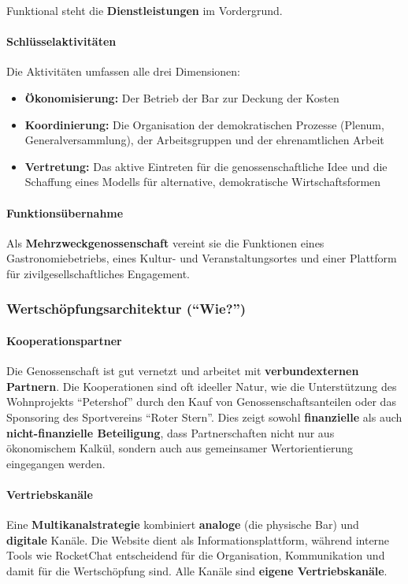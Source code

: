 Funktional steht die \textbf{Dienstleistungen} im Vordergrund.

\paragraph{Schlüsselaktivitäten}
Die Aktivitäten umfassen alle drei Dimensionen:
\begin{itemize}
\item \textbf{Ökonomisierung:} Der Betrieb der Bar zur Deckung der Kosten
\item \textbf{Koordinierung:} Die Organisation der demokratischen Prozesse (Plenum, Generalversammlung), der Arbeitsgruppen und der ehrenamtlichen Arbeit
\item \textbf{Vertretung:} Das aktive Eintreten für die genossenschaftliche Idee und die Schaffung eines Modells für alternative, demokratische Wirtschaftsformen
\end{itemize}

\paragraph{Funktionsübernahme}
Als \textbf{Mehrzweckgenossenschaft} vereint sie die Funktionen eines Gastronomiebetriebs, eines Kultur- und Veranstaltungsortes und einer Plattform für zivilgesellschaftliches Engagement.

\subsubsection{Wertschöpfungsarchitektur (\enquote{Wie?})}

\paragraph{Kooperationspartner}
Die Genossenschaft ist gut vernetzt und arbeitet mit \textbf{verbundexternen Partnern}. Die Kooperationen sind oft ideeller Natur, wie die Unterstützung des Wohnprojekts \enquote{Petershof} durch den Kauf von Genossenschaftsanteilen oder das Sponsoring des Sportvereins \enquote{Roter Stern}. Dies zeigt sowohl \textbf{finanzielle} als auch \textbf{nicht-finanzielle Beteiligung}, dass Partnerschaften nicht nur aus ökonomischem Kalkül, sondern auch aus gemeinsamer Wertorientierung eingegangen werden.

\paragraph{Vertriebskanäle}
Eine \textbf{Multikanalstrategie} kombiniert \textbf{analoge} (die physische Bar) und \textbf{digitale} Kanäle. Die Website dient als Informationsplattform, während interne Tools wie RocketChat entscheidend für die Organisation, Kommunikation und damit für die Wertschöpfung sind. Alle Kanäle sind \textbf{eigene Vertriebskanäle}.

